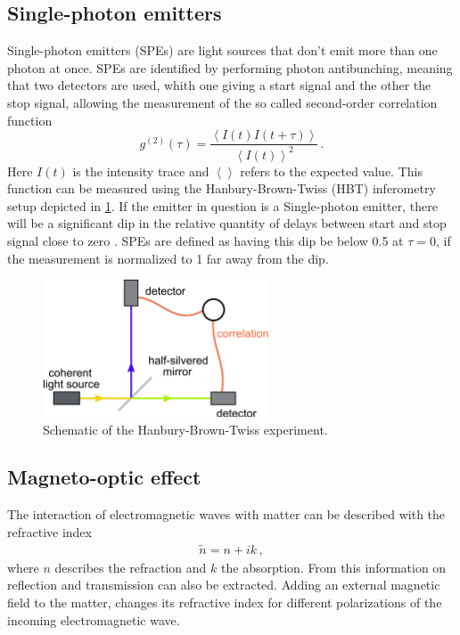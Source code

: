 \subsection{Single-photon emitters}
\label{sec:theory:spe}

Single-photon emitters (SPEs) are light sources that don't emit more than one photon at once.
SPEs are identified by performing photon antibunching, meaning that two detectors are used, whith one giving a start signal and the other the stop signal, allowing the measurement of the so called second-order correlation function
\begin{equation}
  g^{(2)}(\tau) = \frac{\left< I(t) I(t + \tau) \right>}{\left< I(t)\right> ^2} \,.
\end{equation}
Here $I(t)$ is the intensity trace and $\left< \right>$ refers to the expected value.
This function can be measured using the Hanbury-Brown-Twiss (HBT) inferometry setup depicted in \cref{fig_hbt}.
If the emitter in question is a Single-photon emitter, there will be a significant dip in the relative quantity of delays between start and stop signal close to zero \cite{tran2016}.
SPEs are defined as having this dip be below \SI{0.5}{} at $\tau = 0$, if the measurement is normalized to \SI{1}{} far away from the dip.

\begin{figure}[!ht]
    \centering
    \includegraphics[width=0.6\textwidth]{img/Correlation-interferometer}
    \caption{Schematic of the Hanbury-Brown-Twiss experiment. \cite{wikiHBT}}
    \label{fig_hbt}
\end{figure}

\subsection{Magneto-optic effect}

	The interaction of electromagnetic waves with matter can be described with the refractive index
	\begin{align*}
		\tilde{n} = n + ik \,,
	\end{align*}
	where $n$ describes the refraction and $k$ the absorption.
	From this information on reflection and transmission can also be extracted.
	Adding an external magnetic field to the matter, changes its refractive index for different polarizations of the incoming electromagnetic wave.

